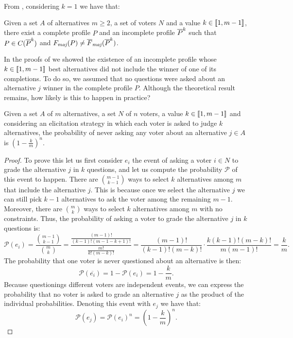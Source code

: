 	From , considering $k=1$ we have that:
	\begin{remark}
		Given a set $A$ of alternatives $m\geq 2$, a set of voters $N$ and a value $k\in \llbracket1,m-1\rrbracket$, there exist a complete profile $P$ and an incomplete profile $\overline{P}^k$ such that $P \in C(\overline{P}^k)$ and $\Fmaj(P) \neq \Fmajbar(\Pbar^k)$.
	\end{remark}

	In the proofs of  we showed the existence of an incomplete profile whose $k \in \llbracket1,m-1\rrbracket$ best alternatives did not include the winner of one of its completions. To do so, we assumed that no questions were asked about an alternative $j$ winner in the complete profile $P$. Although the theoretical result remains, how likely is this to happen in practice?
	
	\begin{proposition}
		\label{pr:probabilityJ}
		Given a set $A$ of $m$ alternatives, a set $N$ of $n$ voters, a value $k\in\llbracket1,m-1\rrbracket$ and considering an elicitation strategy in which each voter is asked to judge $k$ alternatives, the probability of never asking any voter about an alternative $j\in A$ is $(1-\frac{k}{m})^n$. 
	\end{proposition}
	\begin{proof}
		To prove this let us first consider $e_i$ the event of asking a voter $i\in N$ to grade the alternative $j$ in $k$ questions, and let us compute the probability $\mathcal{P}$ of this event to happen.
		There are $\binom{m-1}{k-1}$ ways to select $k$ alternatives among $m$ that include the alternative $j$. This is because once we select the alternative $j$ we can still pick $k-1$ alternatives to ask the voter among the remaining $m-1$.
		Moreover, there are $\binom{m}{k}$ ways to select $k$ alternatives among $m$ with no constraints. Thus, the probability of asking a voter to grade the alternative $j$ in $k$ questions is:
		\[\mathcal{P}(e_i)= \frac{\binom{m-1}{k-1}}{\binom{m}{k}}=\frac{\frac{(m-1)!}{(k-1)!(m-1-k+1)!}}{\frac{m!}{k!(m-k)!}}=\frac{(m-1)!}{(k-1)!(m-k)!}\cdot\frac{k(k-1)!(m-k)!}{m(m-1)!}=\frac{k}{m}.\]
		The probability that one voter is never questioned about an alternative is then:
		\[\mathcal{P}(\overline{e_i})=1-\mathcal{P}(e_i)=1-\frac{k}{m}.\]
		Because questionings different voters are independent events, we can express the probability that no voter is asked to grade an alternative $j$ as the product of the individual probabilities. Denoting this event with $e_j$ we have that:
		\[\mathcal{P}(e_j)=\mathcal{P}(e_i)^n=\left(1-\frac{k}{m}\right)^n.\]
	\end{proof}

